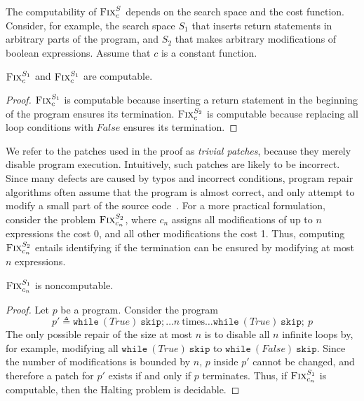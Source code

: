 The computability of $\textsc{Fix}_c^{S}$ depends on the search space and the cost function. Consider, for example, the search space $S_1$ that inserts return statements in arbitrary parts of the program, and $S_2$ that makes arbitrary modifications of boolean expressions. Assume that $c$ is a constant function.

\begin{proposition}
  $\textsc{Fix}_c^{S_1}$ and $\textsc{Fix}_c^{S_1}$ are computable.
\end{proposition}
\begin{proof}
  $\textsc{Fix}_c^{S_1}$ is computable because inserting a return statement in the beginning of the program ensures its termination. $\textsc{Fix}_c^{S_2}$ is computable because replacing all loop conditions with $\mathit{False}$ ensures its termination.
\end{proof}

We refer to the patches used in the proof as \emph{trivial patches}, because they merely disable program execution. Intuitively, such patches are likely to be incorrect. Since many defects are caused by typos and incorrect conditions, program repair algorithms often assume that the program is almost correct, and only attempt to modify a small part of the source code~\cite{mechtaev2015directfix,d2016qlose}. For a more practical formulation, consider the problem $\textsc{Fix}_{c_n}^{S_2}$, where $c_n$ assigns all modifications of up to $n$ expressions the cost 0, and all other modifications the cost 1. Thus, computing $\textsc{Fix}_{c_n}^{S_2}$ entails identifying if the termination can be ensured by modifying at most $n$ expressions.

\begin{proposition}
  $\textsc{Fix}_{c_n}^{S_1}$ is noncomputable.
\end{proposition}
\begin{proof}
Let $p$ be a program. Consider the program $$p' \triangleq \mathtt{while}\ (\mathit{True})\ \mathtt{skip}; \ldots n\ \text{times} \ldots \mathtt{while}\ (\mathit{True})\ \mathtt{skip};\ p$$ The only possible repair of the size at most $n$ is to disable all $n$ infinite loops by, for example, modifying all $\mathtt{while}\ (\mathit{True})\ \mathtt{skip}$ to $\mathtt{while}\ (\mathit{False})\ \mathtt{skip}$. Since the number of modifications is bounded by $n$, $p$ inside $p'$ cannot be changed, and therefore a patch for $p'$ exists if and only if $p$ terminates. Thus, if $\textsc{Fix}_{c_n}^{S_1}$ is computable, then the Halting problem is decidable.
\end{proof}


